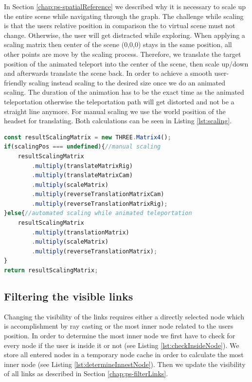 In Section \ref{chap:ps-spatialReference} we described why it is necessary to scale up the entire scene while navigating through the graph. 
The challenge while scaling is that the users relative position in comparison the to virtual scene must not change. Otherwise, the user will get distracted while exploring.
When applying a scaling matrix then center of the scene (0,0,0) stays in the same position, all other points are move by the scaling process. 
Therefore, we translate the target position of the animated teleport into the center of the scene, then scale up/down and afterwards translate the scene back.
In order to achieve a smooth user-friendly scaling instead scaling to the desired size once we do an animated scaling. The duration of the animation has to be the exact time as the animated teleportation otherwise the teleportation path will get distorted and not be a straight line anymore.
For manual scaling we use the world position of the headset for translating. Both calculations can be seen in Listing \ref{lst:scaling}.

\begin{lstlisting}[language=JavaScript,label={lst:scaling},caption=Simplified algorithm for calculating the scaling matrix]
const resultScalingMatrix = new THREE.Matrix4();
if(scalingPos === undefined){//manual scaling
    resultScalingMatrix
        .multiply(translateMatrixRig)
        .multiply(translateMatrixCam)
        .multiply(scaleMatrix)
        .multiply(reverseTranslationMatrixCam)
        .multiply(reverseTranslationMatrixRig);
}else{//automated scaling while animated teleportation
    resultScalingMatrix
        .multiply(translationMatrix)
        .multiply(scaleMatrix)
        .multiply(reverseTranslationMatrix);
}
return resultScalingMatrix;
\end{lstlisting}

\subsection{Filtering the visible links}
\label{sec:linkFiltering}

Changing the visibility of the links requires either a directly selected node which is accomplishment by ray casting or the most inner node related to the users position.
In order to determine the most inner node we first have to check for every node if the user is inside it or not (see Listing \ref{lst:checkInsideNode}). We store all entered nodes in a temporary node cache in order to calculate the most inner node (see Listing \ref{lst:determineInnestNode}).
Then we update the visibility of all links as described in Section \ref{chap:ps-filterLinks}.

